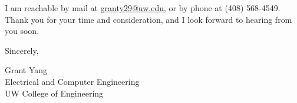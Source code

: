 \documentclass[letterpaper,12pt]{article}
\begin{document}
I am reachable by mail at \href{mailto:granty29@uw.edu}{granty29@uw.edu}, or by phone at (408) 568-4549. Thank you for your time and consideration, and I look forward to hearing from you soon.


\vspace{1.5em}
\noindent Sincerely,

\noindent Grant Yang \\
Electrical and Computer Engineering \\
UW College of Engineering \\
\end{document}
